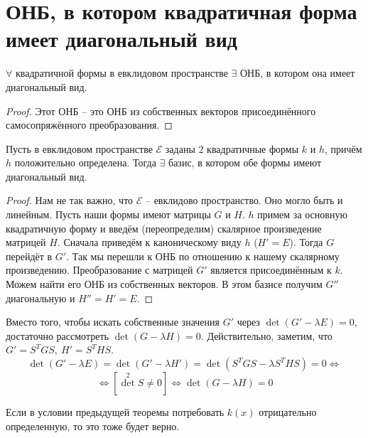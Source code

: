 \documentclass[11pt]{article}
\begin{document}
\section{ОНБ, в котором квадратичная форма имеет диагональный вид}

\begin{theorem}
  $\forall$ квадратичной формы в евклидовом пространстве $\exists$ ОНБ, в 
  котором она имеет диагональный вид.
\end{theorem}

\begin{proof}
  Этот ОНБ -- это ОНБ из собственных векторов присоединённого 
  самосопряжённого преобразования.
\end{proof}

\begin{theorem}
  Пусть в евклидовом пространстве $\mathcal{E}$ заданы 2 квадратичные формы 
  $k$ и $h$, причём $h$ положительно определена. Тогда $\exists$ базис, в 
  котором обе формы имеют диагональный вид.
\end{theorem}

\begin{proof}
  Нам не так важно, что $\mathcal{E}$ -- евклидово пространство. Оно могло 
  быть и линейным. Пусть наши формы имеют матрицы $G$ и $H$. $h$ примем за 
  основную квадратичную форму и введём (переопределим) скалярное произведение 
  матрицей $H$. Сначала приведём к каноническому виду $h$ ($H' = E$). Тогда 
  $G$ перейдёт в $G'$. Так мы перешли к ОНБ по отношению к нашему скалярному 
  произведению. Преобразование с матрицей $G'$ является присоединённым к 
  $k$. Можем найти его ОНБ из собственных векторов. В этом базисе получим 
  $G''$ диагональную и $H'' = H' = E$.
\end{proof}

\begin{remark}
  Вместо того, чтобы искать собственные значения $G'$ через $\det (G' - 
  \lambda E) = 0$, достаточно рассмотреть $\det (G - \lambda H) = 0$. 
  Действительно, заметим, что $G' = S^TGS, \ H' = S^THS$.
  \[\det (G' - \lambda E) = \det (G' - \lambda H') = \det (S^TGS - \lambda 
  S^THS) = 0 \Longleftrightarrow\]
  \[\Longleftrightarrow [{\det}^2 S \neq 0] \Longleftrightarrow \det (G - 
  \lambda H) = 0\]
\end{remark}

\begin{theorem}
  Если в условии предыдущей теоремы потребовать $k(x)$ отрицательно 
  определенную, то это тоже будет верно.
\end{theorem}
\end{document}
